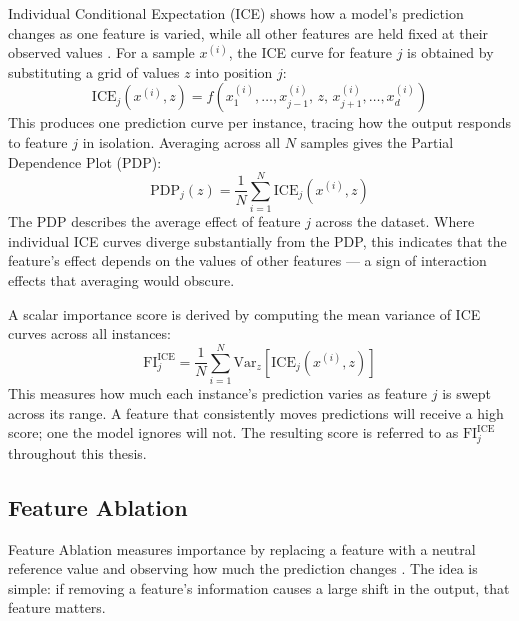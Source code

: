 Individual Conditional Expectation (ICE) shows how a model's prediction changes as one feature is varied, while all other features are held fixed at their observed values \citep{goldstein_peeking_2015}. For a sample $x^{(i)}$, the ICE curve for feature $j$ is obtained by substituting a grid of values $z$ into position $j$:
%
\begin{equation}
    \text{ICE}_j\!\left(x^{(i)}, z\right) = f\!\left(x^{(i)}_1, \ldots, x^{(i)}_{j-1},\, z,\, x^{(i)}_{j+1}, \ldots, x^{(i)}_d\right)
    \label{eq:ice}
\end{equation}
%
This produces one prediction curve per instance, tracing how the output responds to feature $j$ in isolation. Averaging across all $N$ samples gives the Partial Dependence Plot (PDP):
%
\begin{equation}
    \text{PDP}_j(z) = \frac{1}{N} \sum_{i=1}^{N} \text{ICE}_j\!\left(x^{(i)}, z\right)
    \label{eq:pdp}
\end{equation}
%
The PDP describes the average effect of feature $j$ across the dataset. Where individual ICE curves diverge substantially from the PDP, this indicates that the feature's effect depends on the values of other features — a sign of interaction effects that averaging would obscure.

A scalar importance score is derived by computing the mean variance of ICE curves across all instances:
%
\begin{equation}
    \text{FI}^{\text{ICE}}_j = \frac{1}{N} \sum_{i=1}^{N} \text{Var}_z \!\left[ \text{ICE}_j\!\left(x^{(i)}, z\right) \right]
    \label{eq:ice_fi}
\end{equation}
%
This measures how much each instance's prediction varies as feature $j$ is swept across its range. A feature that consistently moves predictions will receive a high score; one the model ignores will not. The resulting score is referred to as $\text{FI}^{\text{ICE}}_j$ throughout this thesis.

\subsection{Feature Ablation}

Feature Ablation measures importance by replacing a feature with a neutral reference value and observing how much the prediction changes \citep{zeiler2014visualizing}. The idea is simple: if removing a feature's information causes a large shift in the output, that feature matters.

